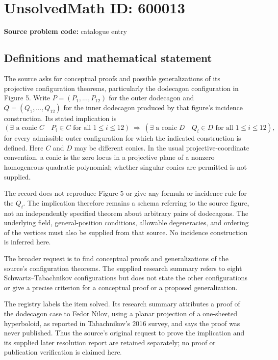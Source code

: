 \documentclass[11pt]{article}
\begin{document}
\section*{UnsolvedMath ID: 600013}
\textbf{Source problem code:} catalogue entry
\subsection{Definitions and mathematical statement}
The source asks for conceptual proofs and possible generalizations of its projective configuration theorems, particularly the dodecagon configuration in Figure 5. Write $P=(P_1,\ldots,P_{12})$ for the outer dodecagon and $Q=(Q_1,\ldots,Q_{12})$ for the inner dodecagon produced by that figure's incidence construction. Its stated implication is
\[
\left(\exists\text{ a conic }C\quad P_i\in C\text{ for all }1\le i\le12\right)
\ \Longrightarrow\
\left(\exists\text{ a conic }D\quad Q_i\in D\text{ for all }1\le i\le12\right),
\]
for every admissible outer configuration for which the indicated construction is defined. Here $C$ and $D$ may be different conics. In the usual projective-coordinate convention, a conic is the zero locus in a projective plane of a nonzero homogeneous quadratic polynomial; whether singular conics are permitted is not supplied.

The record does not reproduce Figure 5 or give any formula or incidence rule for the $Q_i$. The implication therefore remains a schema referring to the source figure, not an independently specified theorem about arbitrary pairs of dodecagons. The underlying field, general-position conditions, allowable degeneracies, and ordering of the vertices must also be supplied from that source. No incidence construction is inferred here.

The broader request is to find conceptual proofs and generalizations of the source's configuration theorems. The supplied research summary refers to eight Schwartz--Tabachnikov configurations but does not state the other configurations or give a precise criterion for a conceptual proof or a proposed generalization.

The registry labels the item solved. Its research summary attributes a proof of the dodecagon case to Fedor Nilov, using a planar projection of a one-sheeted hyperboloid, as reported in Tabachnikov's 2016 survey, and says the proof was never published. Thus the source's original request to prove the implication and its supplied later resolution report are retained separately; no proof or publication verification is claimed here.
\end{document}
